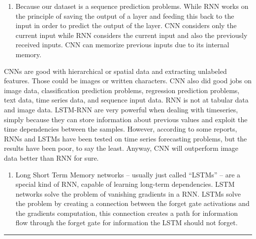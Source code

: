 \documentclass[11pt]{article}
\providecommand{\tightlist}{%
      \setlength{\itemsep}{0pt}\setlength{\parskip}{0pt}}
\begin{document}
    \begin{enumerate}
\def\labelenumi{\arabic{enumi})}
\setcounter{enumi}{7}
\tightlist
\item
  Because our dataset is a sequence prediction problems. While RNN works
  on the principle of saving the output of a layer and feeding this back
  to the input in order to predict the output of the layer. CNN
  considers only the current input while RNN considers the current input
  and also the previously received inputs. CNN can memorize previous
  inputs due to its internal memory.
\end{enumerate}

CNNs are good with hierarchical or spatial data and extracting unlabeled
features. Those could be images or written characters. CNN also did good
jobs on image data, classification prediction problems, regression
prediction problems, text data, time series data, and sequence input
data. RNN is not at tabular data and image data. LSTM-RNN are very
powerful when dealing with timeseries, simply because they can store
information about previous values and exploit the time dependencies
between the samples. However, according to some reports, RNNs and LSTMs
have been tested on time series forecasting problems, but the results
have been poor, to say the least. Anyway, CNN will outperform image data
better than RNN for sure.

    \begin{enumerate}
\def\labelenumi{\arabic{enumi})}
\setcounter{enumi}{8}
\tightlist
\item
  Long Short Term Memory networks -- usually just called ``LSTMs'' --
  are a special kind of RNN, capable of learning long-term dependencies.
  LSTM networks solve the problem of vanishing gradients in a RNN. LSTMs
  solve the problem by creating a connection between the forget gate
  activations and the gradients computation, this connection creates a
  path for information flow through the forget gate for information the
  LSTM should not forget.
\end{enumerate}

    \begin{center}\rule{0.5\linewidth}{\linethickness}\end{center}


    
    
    
    
\end{document}
